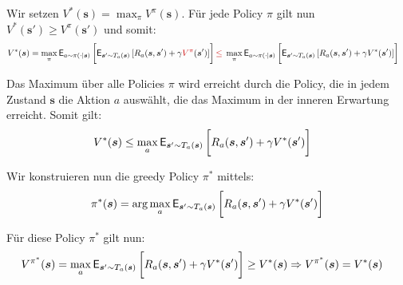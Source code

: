 \begin{beweis}
  Wir setzen $V^* (\bm{s}) = \max_{\pi} V^{\pi}(\bm{s})$. 
  Für jede Policy $\pi$ gilt nun $V^*(\bm{s}') \geq V^{\pi}(\bm{s}')$ und somit:
  \begin{align*}
      V^{*}(\bm{s})
      &= \max_{\pi} 
      \mathsf{E}_{a \sim \pi(\cdot|\bm{s})} 
      \left[ 
          \vphantom{\int}
          \mathsf{E}_{\bm{s}' \sim T_a(\bm{s})} 
          \left[ 
              R_{a}(\bm{s}, \bm{s}') + \gamma \rot{V^{\pi}}(\bm{s}')
          \right] 
      \right] 
      \rot{\leq}\;
      \max_{\pi}
      \mathsf{E}_{a \sim \pi(\cdot|\bm{s})}
      \left[ 
          \vphantom{\int}
          \mathsf{E}_{\bm{s}' \sim T_a(\bm{s})} 
          \left[
              R_{a}(\bm{s}, \bm{s}') + \gamma V^{*}(\bm{s}')
          \right]
      \right]
  \end{align*}

  Das Maximum über alle Policies $\pi$ wird erreicht durch die Policy,
  die in jedem Zustand $\bm{s}$ die Aktion $a$ auswählt, die das Maximum 
  in der inneren Erwartung erreicht. Somit gilt:
  \begin{align*}
      V^{*}(\bm{s})
      &\leq \max_{a} \mathsf{E}_{\bm{s}' \sim T_a(\bm{s})}
      \left[
          \vphantom{\int}
          R_{a}(\bm{s}, \bm{s}') + \gamma V^{*}(\bm{s}')
      \right]
  \end{align*}

  Wir konstruieren nun die greedy Policy $\pi^*$ mittels:
  \begin{align*}
      \pi^*(\bm{s}) 
      =
      \arg\max_{a} \mathsf{E}_{\bm{s}' \sim T_a(\bm{s})}
      \left[
          \vphantom{\int}
          R_{a}(\bm{s}, \bm{s}') + \gamma V^{*}(\bm{s}')
      \right]
  \end{align*}

  Für diese Policy $\pi^*$ gilt nun:
  \begin{align*}
      V^{\pi^*}(\bm{s})
      &= 
      \max_{a} \mathsf{E}_{\bm{s}' \sim T_a(\bm{s})}
      \left[
          \vphantom{\int}
          R_{a}(\bm{s}, \bm{s}') + \gamma V^{*}(\bm{s}')
      \right]
      \geq V^{*}(\bm{s})
      \Rightarrow
      V^{\pi^*}(\bm{s}) = V^{*}(\bm{s})
  \end{align*}
\end{beweis}

